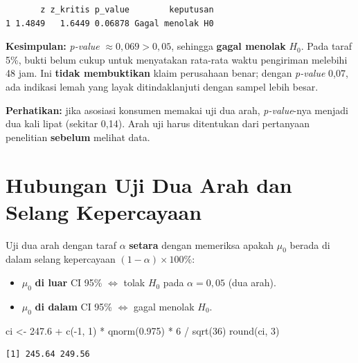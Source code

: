 \documentclass[
  indonesian,
  letterpaper,
]{book}
\newenvironment{Shaded}{\begin{snugshade}}{\end{snugshade}}
\newcommand{\DecValTok}[1]{\textcolor[rgb]{0.68,0.00,0.00}{#1}}
\newcommand{\FloatTok}[1]{\textcolor[rgb]{0.68,0.00,0.00}{#1}}
\newcommand{\FunctionTok}[1]{\textcolor[rgb]{0.28,0.35,0.67}{#1}}
\newcommand{\NormalTok}[1]{\textcolor[rgb]{0.00,0.23,0.31}{#1}}
\newcommand{\OtherTok}[1]{\textcolor[rgb]{0.00,0.23,0.31}{#1}}
\newcommand{\SpecialCharTok}[1]{\textcolor[rgb]{0.37,0.37,0.37}{#1}}
\providecommand{\tightlist}{%
  \setlength{\itemsep}{0pt}\setlength{\parskip}{0pt}}
\begin{document}
\begin{verbatim}
       z z_kritis p_value        keputusan
1 1.4849   1.6449 0.06878 Gagal menolak H0
\end{verbatim}

\textbf{Kesimpulan:} \emph{p-value} \(\approx 0{,}069 > 0{,}05\),
sehingga \textbf{gagal menolak} \(H_0\). Pada taraf 5\%, bukti belum
cukup untuk menyatakan rata-rata waktu pengiriman melebihi 48 jam. Ini
\textbf{tidak membuktikan} klaim perusahaan benar; dengan \emph{p-value}
0,07, ada indikasi lemah yang layak ditindaklanjuti dengan sampel lebih
besar.

\textbf{Perhatikan:} jika asosiasi konsumen memakai uji dua arah,
\emph{p-value}-nya menjadi dua kali lipat (sekitar 0,14). Arah uji harus
ditentukan dari pertanyaan penelitian \textbf{sebelum} melihat data.

\section{Hubungan Uji Dua Arah dan Selang
Kepercayaan}\label{hubungan-uji-dua-arah-dan-selang-kepercayaan}

Uji dua arah dengan taraf \(\alpha\) \textbf{setara} dengan memeriksa
apakah \(\mu_0\) berada di dalam selang kepercayaan
\((1 - \alpha) \times 100\%\):

\begin{itemize}
\tightlist
\item
  \(\mu_0\) \textbf{di luar} CI 95\% \(\Longleftrightarrow\) tolak
  \(H_0\) pada \(\alpha = 0{,}05\) (dua arah).
\item
  \(\mu_0\) \textbf{di dalam} CI 95\% \(\Longleftrightarrow\) gagal
  menolak \(H_0\).
\end{itemize}

\begin{Shaded}
\begin{Highlighting}[]
\NormalTok{ci }\OtherTok{\textless{}{-}} \FloatTok{247.6} \SpecialCharTok{+} \FunctionTok{c}\NormalTok{(}\SpecialCharTok{{-}}\DecValTok{1}\NormalTok{, }\DecValTok{1}\NormalTok{) }\SpecialCharTok{*} \FunctionTok{qnorm}\NormalTok{(}\FloatTok{0.975}\NormalTok{) }\SpecialCharTok{*} \DecValTok{6} \SpecialCharTok{/} \FunctionTok{sqrt}\NormalTok{(}\DecValTok{36}\NormalTok{)}
\FunctionTok{round}\NormalTok{(ci, }\DecValTok{3}\NormalTok{)}
\end{Highlighting}
\end{Shaded}

\begin{verbatim}
[1] 245.64 249.56
\end{verbatim}
\end{document}
